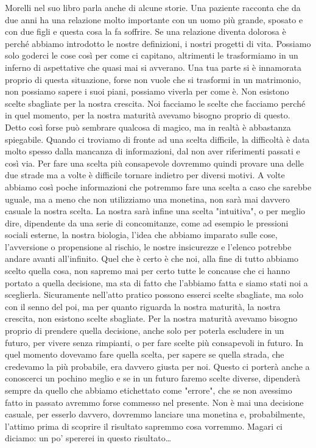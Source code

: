 \documentclass[12pt]{book} %
\begin{document}
Morelli nel suo libro parla anche di alcune storie. Una paziente racconta che da due anni ha una relazione molto
importante con un uomo più grande, sposato e con due figli e questa cosa la fa soffrire. Se una relazione diventa
dolorosa è perché abbiamo introdotto le nostre definizioni, i nostri progetti di vita. Possiamo solo goderci le cose
così per come ci capitano, altrimenti le trasformiamo in un inferno di aspettative che quasi mai si avverano. Una tua
parte si è innamorata proprio di questa situazione, forse non vuole che si trasformi in un matrimonio, non possiamo
sapere i suoi piani, possiamo viverla per come è. Non esistono scelte sbagliate per la nostra crescita. Noi facciamo le
scelte che facciamo perché in quel momento, per la nostra maturità avevamo bisogno proprio di questo. 
Detto così forse può sembrare qualcosa di magico, ma in realtà è abbastanza spiegabile. Quando ci troviamo di fronte ad una scelta difficile, la difficoltà è data molto spesso dalla mancanza di informazioni, dal non aver riferimenti passati e così via. Per fare una scelta più consapevole dovremmo quindi provare una delle due strade ma a volte è difficile tornare indietro per diversi motivi. A volte abbiamo così poche informazioni che potremmo fare una scelta a caso che sarebbe uguale, ma a meno che non utilizziamo una monetina, non sarà mai davvero casuale la nostra scelta. La nostra sarà infine una scelta "intuitiva", o per meglio dire, dipendente da una serie di concomitanze, come ad esempio le pressioni sociali esterne, la nostra biologia, l'idea che abbiamo imparato sulle cose, l'avversione o propensione al rischio, le nostre insicurezze e l'elenco potrebbe andare avanti all'infinito. Quel che è certo è che noi, alla fine di tutto abbiamo scelto quella cosa, non sapremo mai per certo tutte le concause che ci hanno portato a quella decisione, ma sta di fatto che l'abbiamo fatta e siamo stati noi a sceglierla. Sicuramente nell'atto pratico possono esserci scelte sbagliate, ma solo con il senno del poi, ma per quanto riguarda la nostra maturità, la nostra crescita, non esistono scelte sbagliate. Per la nostra maturità avevamo bisogno proprio di prendere quella decisione, anche solo per poterla escludere in un futuro, per vivere senza rimpianti, o per fare scelte più consapevoli in futuro. In quel momento dovevamo fare quella scelta, per sapere se quella strada, che credevamo la più probabile, era davvero giusta per noi. Questo ci porterà anche a conoscerci un pochino meglio e se in un futuro faremo scelte diverse, dipenderà sempre da quello che abbiamo etichettato come "errore", che se non avessimo fatto in passato avremmo forse commesso nel presente. Non è mai una decisione casuale, per esserlo davvero, dovremmo lanciare una monetina e, probabilmente, l'attimo prima di scoprire il risultato sapremmo cosa vorremmo. Magari ci diciamo: un po' spererei in questo risultato… 
\end{document}
